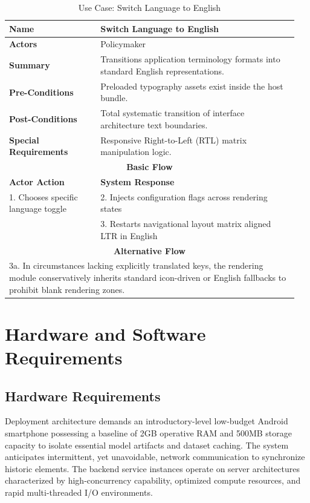 \begin{table}[htbp]
  \centering
  \caption{Use Case: Switch Language to English}
  \label{uc:switch_urdu}
  \begin{tabular}{|p{0.3\linewidth}|p{0.65\linewidth}|}
    \hline
    \textbf{Name} & Switch Language to English \\
    \hline
    \textbf{Actors} & Policymaker \\
    \hline
    \textbf{Summary} & Transitions application terminology formats into standard English representations. \\
    \hline
    \textbf{Pre-Conditions} & Preloaded typography assets exist inside the host bundle. \\
    \hline
    \textbf{Post-Conditions} & Total systematic transition of interface architecture text boundaries. \\
    \hline
    \textbf{Special Requirements} & Responsive Right-to-Left (RTL) matrix manipulation logic. \\
    \hline
    \multicolumn{2}{|c|}{\textbf{Basic Flow}} \\
    \hline
    \textbf{Actor Action} & \textbf{System Response} \\
    \hline
    1. Chooses specific language toggle & 2. Injects configuration flags across rendering states \\
    & 3. Restarts navigational layout matrix aligned LTR in English \\
    \hline
    \multicolumn{2}{|c|}{\textbf{Alternative Flow}} \\
    \hline
    \multicolumn{2}{|p{0.95\linewidth}|}{3a. In circumstances lacking explicitly translated keys, the rendering module conservatively inherits standard icon-driven or English fallbacks to prohibit blank rendering zones.} \\
    \hline
  \end{tabular}
\end{table}

\section{Hardware and Software Requirements}

\subsection{Hardware Requirements}
Deployment architecture demands an introductory-level low-budget Android smartphone possessing a baseline of 2GB operative RAM and 500MB storage capacity to isolate essential model artifacts and dataset caching. The system anticipates intermittent, yet unavoidable, network communication to synchronize historic elements. The backend service instances operate on server architectures characterized by high-concurrency capability, optimized compute resources, and rapid multi-threaded I/O environments.

